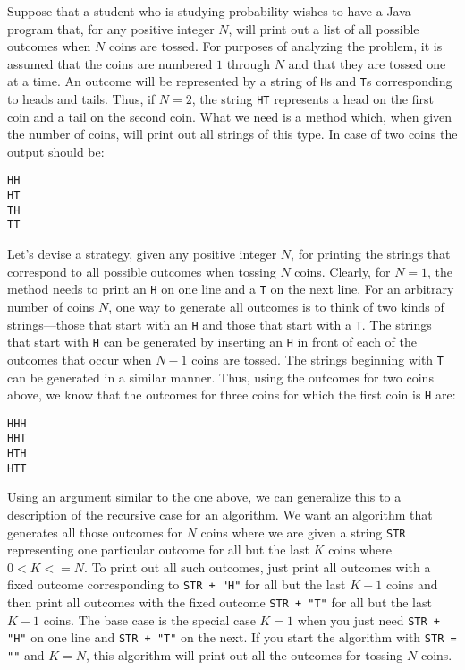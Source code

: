 \noindent Suppose that a student who is studying probability wishes to have a Java 
program that, for any positive integer $N$, will print out a list of all possible 
outcomes when $N$ coins are tossed.  For purposes of analyzing the problem, it is 
assumed that the coins are numbered $1$ through $N$ and that they are tossed one 
at a time.  An outcome will be represented by a string of {\tt H}s and {\tt T}s 
corresponding to heads and tails.  Thus, if $N = 2$, the string {\tt HT}  represents 
a head on the first  coin and a tail on the second coin.  What we need is a method 
which, when given the number of coins, will print out all strings of this type.  
In case of two coins the output should be:

\begin{jjjlisting}
\begin{lstlisting}
HH
HT
TH
TT
\end{lstlisting}
\end{jjjlisting}

Let's devise a strategy, given any positive integer $N$, for printing the strings 
that correspond to all possible outcomes when tossing $N$ coins. Clearly, for $N = 1$, 
the method needs to print an {\tt H} on one line and a {\tt T} on the next line.  For 
an arbitrary number of coins $N$, one way to generate all outcomes is to think of 
two kinds of strings---those that start with an {\tt H} and those that start with a {\tt T}.  
The strings that start with {\tt H} can be generated by inserting an {\tt H} in front of 
each of the outcomes that occur when $N-1$ coins are tossed.  The strings beginning with 
{\tt T} can be generated in a similar manner.  Thus, using the outcomes for two coins 
above, we know that the outcomes for three coins for which the first coin is {\tt H} are:

\begin{jjjlisting}
\begin{lstlisting}
HHH
HHT
HTH
HTT
\end{lstlisting}
\end{jjjlisting}

Using an argument similar to the one above, we can generalize this to
a description of the recursive case for an algorithm. We want an
algorithm that generates all those outcomes for $N$ coins where we are
given a string {\tt STR} representing one particular outcome for all
but the last $K$ coins where $0 < K <= N$.  To print out all such
outcomes, just print all 
outcomes with a fixed outcome corresponding to {\tt STR + "H"} for all
but the last $K - 1$ coins and then print all outcomes with the fixed
outcome {\tt STR + "T"} for all but the last $K - 1$ coins.  The base
case is the special case $K = 1$ when you just need {\tt STR
+ "H"} on one line and  {\tt STR + "T"} on the next.  If you
start the algorithm with {\tt STR = ""} and $K = N$, this algorithm
will print out all the outcomes for tossing $N$ coins.

